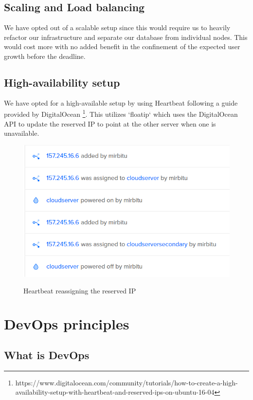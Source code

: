 \documentclass{article}
\begin{document}
\subsection{Scaling and Load balancing}

We have opted out of a scalable setup since this would require us to heavily refactor our infrastructure and separate our database from individual nodes. This would cost more with no added benefit in the confinement of the expected user growth before the deadline.  

\subsection{High-availability setup}

We have opted for a high-available setup by using Heartbeat following a guide provided by DigitalOcean \footnote{https://www.digitalocean.com/community/tutorials/how-to-create-a-high-availability-setup-with-heartbeat-and-reserved-ips-on-ubuntu-16-04}. This utilizes `floatip` which uses the DigitalOcean API to update the reserved IP to point at the other server when one is unavailable. 

\begin{figure}[h]
    \includegraphics[scale=0.7]{images/Heartbeat_Working.png}
    \label{fig:cd_pipeline}
    \caption{Heartbeat reassigning the reserved IP}
    \centering
\end{figure}

\section{DevOps principles}\label{DevOpsPrinciplesSection}

\subsection{What is DevOps}
\end{document}
